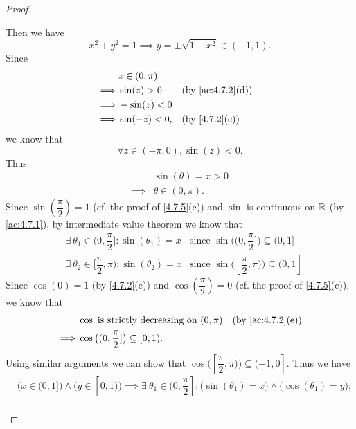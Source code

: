 \begin{proof}
\begin{itemize}
          Then we have
          \[
            x^2 + y^2 = 1 \implies y = \pm \sqrt{1 - x^2} \in (-1, 1).
          \]
          Since
          \begin{align*}
                     & z \in (0, \pi)                                     \\
            \implies & \sin(z) > 0    &  & \text{(by \cref{ac:4.7.2}(d))} \\
            \implies & -\sin(z) < 0                                       \\
            \implies & \sin(-z) < 0,  &  & \text{(by \cref{4.7.2}(c))}
          \end{align*}
          we know that
          \[
            \forall z \in (-\pi, 0), \sin(z) < 0.
          \]
          Thus
          \begin{align*}
                     & \sin(\theta) = x > 0 \\
            \implies & \theta \in (0, \pi).
          \end{align*}
          Since \(\sin(\dfrac{\pi}{2}) = 1\) (cf. the proof of \cref{4.7.5}(c)) and \(\sin\) is continuous on \(\mathbb{R}\) (by \cref{ac:4.7.1}), by intermediate value theorem we know that
          \begin{align*}
             & \exists\ \theta_1 \in (0, \dfrac{\pi}{2}] : \sin(\theta_1) = x   & \text{since } \sin\big((0, \dfrac{\pi}{2}]\big) \subseteq (0, 1]   \\
             & \exists\ \theta_2 \in [\dfrac{\pi}{2}, \pi) : \sin(\theta_2) = x & \text{since } \sin\big([\dfrac{\pi}{2}, \pi)\big) \subseteq (0, 1]
          \end{align*}
          Since \(\cos(0) = 1\) (by \cref{4.7.2}(e)) and \(\cos(\dfrac{\pi}{2}) = 0\) (cf. the proof of \cref{4.7.5}(c)), we know that
          \begin{align*}
                     & \cos \text{ is strictly decreasing on } (0, \pi)    &  & \text{(by \cref{ac:4.7.2}(e))} \\
            \implies & \cos\big((0, \dfrac{\pi}{2}]\big) \subseteq [0, 1).
          \end{align*}
          Using similar arguments we can show that \(\cos\big([\dfrac{\pi}{2}, \pi)\big) \subseteq (-1, 0]\).
          Thus we have
          \begin{align*}
             & \big(x \in (0, 1]\big) \land \big(y \in [0, 1)\big) \implies \exists\ \theta_1 \in (0, \dfrac{\pi}{2}] : \big(\sin(\theta_1) = x\big) \land \big(\cos(\theta_1) = y\big);    \\

\end{align*}
\end{itemize}
\end{proof}
